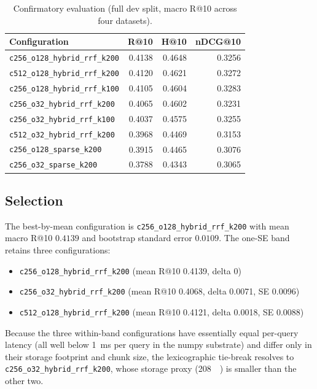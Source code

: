 \documentclass[11pt,a4paper]{article}
\begin{document}
\begin{table}[h]
\centering
\caption{Confirmatory evaluation (full dev split, macro R@10 across
four datasets).}
\label{tab:confirm}
\small
\begin{tabular}{l r r r}
\toprule
\textbf{Configuration} & \textbf{R@10} & \textbf{H@10} & \textbf{nDCG@10} \\
\midrule
\texttt{c256\_o128\_hybrid\_rrf\_k200} & \num{0.4138} & \num{0.4648} & \num{0.3256} \\
\texttt{c512\_o128\_hybrid\_rrf\_k200} & \num{0.4120} & \num{0.4621} & \num{0.3272} \\
\texttt{c256\_o128\_hybrid\_rrf\_k100} & \num{0.4105} & \num{0.4604} & \num{0.3283} \\
\texttt{c256\_o32\_hybrid\_rrf\_k200}  & \num{0.4065} & \num{0.4602} & \num{0.3231} \\
\texttt{c256\_o32\_hybrid\_rrf\_k100}  & \num{0.4037} & \num{0.4575} & \num{0.3255} \\
\texttt{c512\_o32\_hybrid\_rrf\_k200}  & \num{0.3968} & \num{0.4469} & \num{0.3153} \\
\texttt{c256\_o128\_sparse\_k200}      & \num{0.3915} & \num{0.4465} & \num{0.3076} \\
\texttt{c256\_o32\_sparse\_k200}       & \num{0.3788} & \num{0.4343} & \num{0.3065} \\
\bottomrule
\end{tabular}
\end{table}

\subsection{Selection}
The best-by-mean configuration is
\texttt{c256\_o128\_hybrid\_rrf\_k200} with mean macro R@10
$\num{0.4139}$ and bootstrap standard error $\num{0.0109}$. The
one-SE band retains three configurations:

\begin{itemize}[leftmargin=1.5em,itemsep=0.15em]
  \item \texttt{c256\_o128\_hybrid\_rrf\_k200} (mean R@10 \num{0.4139}, delta 0)
  \item \texttt{c256\_o32\_hybrid\_rrf\_k200} (mean R@10 \num{0.4068}, delta \num{0.0071}, SE \num{0.0096})
  \item \texttt{c512\_o128\_hybrid\_rrf\_k200} (mean R@10 \num{0.4121}, delta \num{0.0018}, SE \num{0.0088})
\end{itemize}

Because the three within-band configurations have essentially equal
per-query latency (all well below \SI{1}{\milli\second} per query
in the numpy substrate) and differ only in their storage footprint
and chunk size, the lexicographic tie-break resolves to
\texttt{c256\_o32\_hybrid\_rrf\_k200}, whose storage proxy
(\SI{208}{\mega\byte}) is smaller than the other two.
\end{document}
